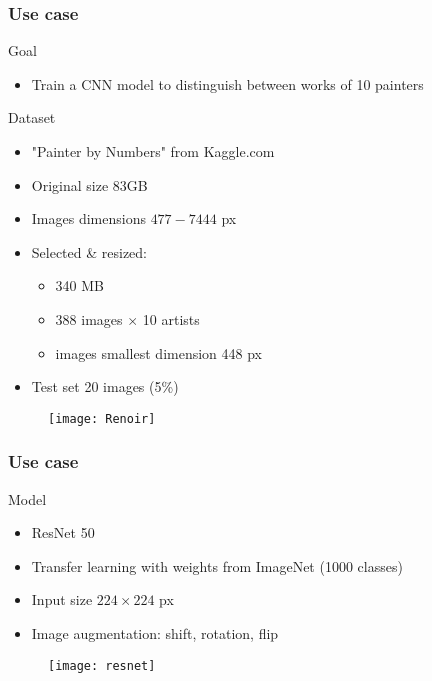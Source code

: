 \documentclass[aspectratio=169]{beamer}
\begin{document}
\begin{frame}
\frametitle{Use case}

\begin{block}{Goal}
	\begin{itemize}
		\item \large Train a CNN model to distinguish between works of 10 painters
	\end{itemize}
\end{block}

\begin{block}{Dataset}
	\begin{multicols*}{2}
	\begin{itemize}
		\item "Painter by Numbers" from Kaggle.com
		\item Original size 83GB
		\item Images dimensions $477 - 7444$ px
		\item Selected \& resized: 
		\begin{itemize}
			\item 340 MB
			\item 388 images $\times$ 10 artists
			\item images smallest dimension 448 px 
		\end{itemize}
		\item Test set 20 images (5\%)
	\end{itemize}
	\begin{figure}
		\texttt{[image: Renoir]}
	\end{figure}

	\end{multicols*}
\end{block}

\end{frame}


\begin{frame}
\frametitle{Use case}

\begin{block}{Model}
	\begin{itemize}
		\item ResNet 50
		\item Transfer learning with weights from ImageNet (1000 classes)
		\item Input size $224 \times 224$ px
		\item Image augmentation: shift, rotation, flip
	\end{itemize}
\end{block}
\begin{figure}
	\texttt{[image: resnet]}
\end{figure}

\end{frame}
\end{document}
